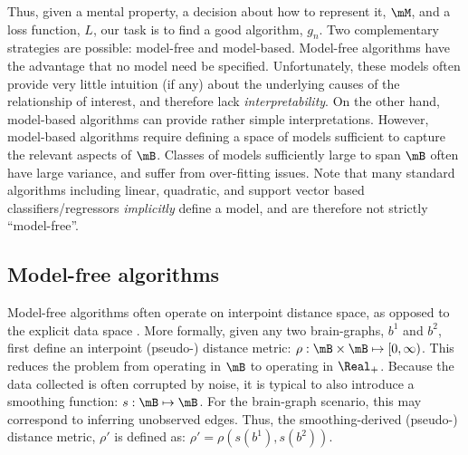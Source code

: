 
Thus, given a mental property, a decision about how to represent it, $\mM$, and a loss function, $L$, our task is to find a good algorithm, $g_n$. Two complementary strategies are possible: model-free and model-based. Model-free algorithms have the advantage that no model need be specified. %
Unfortunately, these models often provide very little intuition (if any) about the underlying causes of the relationship of interest, and therefore lack \emph{interpretability}.  On the other hand, model-based algorithms can provide rather simple interpretations.  However, model-based algorithms require defining a space of models sufficient to capture the relevant aspects of $\mB$.  Classes of models sufficiently large to span $\mB$ often have large variance, and suffer from over-fitting issues.  %
Note that many standard algorithms including linear, quadratic, and support vector based classifiers/regressors \emph{implicitly} define a model, and are therefore not strictly ``model-free''.

\subsection{Model-free algorithms} %
\label{sub:model_free_algorithms}

Model-free algorithms often operate on interpoint distance space, as opposed to the explicit data space \cite{MaaBartoszynski96}. More formally, given any two brain-graphs, $b^1$ and $b^2$, first define an interpoint (pseudo-) distance metric: $\rho: \mB \times \mB \mapsto [0,\infty)$. This reduces the problem from operating in $\mB$ to operating in $\Real_+$. Because the data collected is often corrupted by noise, it is typical to also introduce a smoothing function: $s: \mB \mapsto \mB$. For the brain-graph scenario, this may correspond to inferring unobserved edges. Thus, the smoothing-derived (pseudo-) distance metric, $\rho'$ is defined as: $\rho' = \rho(s(b^1),s(b^2))$. 

